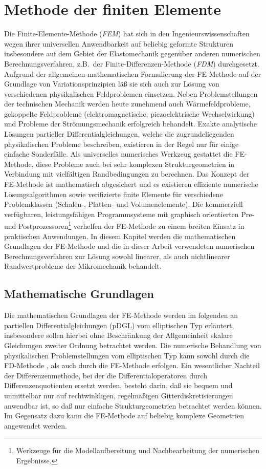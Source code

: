 \chapter{Methode der finiten Elemente}
\label{femethode}

Die Finite-Elemente-Methode ({\em FEM}) hat sich in den
Ingenieurswissenschaften wegen ihrer universellen Anwendbarkeit auf
beliebig geformte Strukturen insbesondere auf dem Gebiet der Elastomechanik
gegenüber anderen numerischen Berechnungsverfahren, z.B.\ der
Finite-Differenzen-Methode ({\em FDM})
durchgesetzt. Aufgrund der allgemeinen mathematischen Formulierung
der FE-Methode auf der Grundlage von Variationsprinzipien läß sie sich auch
zur Lösung von verschiedenen physikalischen Feldproblemen einsetzen. Neben
Problemstellungen der
technischen Mechanik werden heute zunehmend auch Wärmefeldprobleme,
gekoppelte Feldprobleme (elektromagnetische, piezoelektrische Wechselwirkung)
und Probleme der Strömungsmechanik erfolgreich behandelt. Exakte analytische
Lösungen partieller Differentialgleichungen, welche die zugrundeliegenden
physikalischen Probleme beschreiben, existieren in der Regel nur für
einige einfache Sonderfälle. Als universelles numerisches Werkzeug gestattet
die FE-Methode, diese Probleme auch bei sehr komplexen Strukturgeometrien in
Verbindung mit vielfältigen Randbedingungen zu berechnen.
Das Konzept der FE-Methode ist mathematisch abgesichert und es existieren
effiziente numerische Lösungsalgorithmen sowie verifizierte finite Elemente
für verschiedene Problemklassen (Schalen-, Platten- und Volumenelemente).
Die kommerziell verfügbaren, leistungsfähigen Programmsysteme mit graphisch
orientierten Pre- und Postprozessoren\footnote{Werkzeuge für die
Modellaufbereitung und
Nachbearbeitung der numerischen Ergebnisse.} verhelfen der FE-Methode
zu einem breiten Einsatz in praktischen Anwendungen. In diesem
Kapitel werden die mathematischen Grundlagen der FE-Methode und
die in dieser Arbeit verwendeten numerischen Berechnungsverfahren zur
Lösung sowohl linearer, als auch nichtlinearer Randwertprobleme der
Mikromechanik behandelt.


\section{Mathematische Grundlagen}
\label{mathgrundlagen}

Die mathematischen Grundlagen der FE-Methode werden im folgenden an
partiellen Differentialgleichungen (pDGL) vom elliptischen Typ erläutert,
insbesondere sollen hierbei ohne Beschränkung der Allgemeinheit
skalare Gleichungen zweiter Ordnung betrachtet
werden. Die numerische Behandlung von physikalischen Problemstellungen vom
elliptischen Typ kann sowohl durch die FD-Methode \cite{Mar89}, als
auch durch die FE-Methode erfolgen. Ein wesentlicher Nachteil der
Differenzenmethode, bei der die Differentialoperatoren durch
Differenzenquotienten ersetzt werden, besteht darin, daß sie bequem und
unmittelbar nur auf rechtwinkligen, regelmäßigen Gitterdiskretisierungen
anwendbar ist, so daß nur einfache Strukturgeometrien betrachtet werden
können. Im Gegensatz dazu kann die FE-Methode auf beliebig komplexe
Geometrien angewendet werden.


